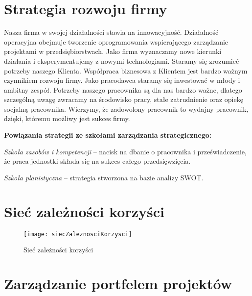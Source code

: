 
\section{Strategia rozwoju firmy}

Nasza firma w swojej działalności stawia na innowacyjność. Działalność operacyjna obejmuje tworzenie oprogramowania wspierającego zarządzanie projektami w przedsiębiorstwach. Jako firma wyznaczamy nowe kierunki działania i eksperymentujemy z nowymi technologiami. Staramy się zrozumieć potrzeby naszego Klienta. Współpraca biznesowa z Klientem jest bardzo ważnym czynnikiem rozwoju firmy. 
Jako pracodawca staramy się inwestować w młody i ambitny zespół. Potrzeby naszego pracownika są dla nas bardzo ważne, dlatego szczególną uwagę zwracamy na środowisko pracy, stałe zatrudnienie oraz opiekę socjalną pracownika. Wierzymy, że zadowolony pracownik to wydajny pracownik, dzięki, któremu możliwy jest sukces firmy.  

\textbf{Powiązania strategii ze szkołami zarządzania strategicznego:}

\textit{Szkoła zasobów i kompetencji} – nacisk na dbanie o pracownika i przeświadczenie, że praca jednostki składa się na sukces całego przedsięwzięcia.

\textit{Szkoła planistyczna} – strategia stworzona na bazie analizy SWOT.



\section{Sieć zależności korzyści}

\begin{figure}[!h]
\centering
\texttt{[image: siecZaleznosciKorzysci]}
\caption{Sieć zależności korzyści}
\label{fig:siecZaleznosciKorzysci}
\end{figure}



\section{Zarządzanie portfelem projektów}

